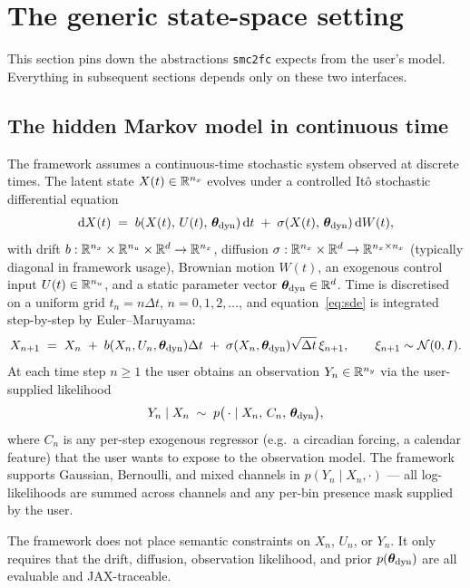 \section{The generic state-space setting} \label{sec:setting}

This section pins down the abstractions \texttt{smc2fc} expects from the
user's model. Everything in subsequent sections depends only on these
two interfaces.

\subsection{The hidden Markov model in continuous time}

The framework assumes a continuous-time stochastic system observed at
discrete times. The latent state $X(t) \in \mathbb{R}^{n_x}$ evolves under a
controlled It\^o stochastic differential equation
\begin{equation}
\mathrm{d} X(t) \;=\; b(X(t),\, U(t),\, \bm{\theta}_{\rm dyn})\, \mathrm{d} t
            \;+\; \sigma(X(t),\, \bm{\theta}_{\rm dyn})\, \mathrm{d} W(t),
\label{eq:sde}
\end{equation}
with drift $b: \mathbb{R}^{n_x} \times \mathbb{R}^{n_u} \times \mathbb{R}^d \to \mathbb{R}^{n_x}$,
diffusion $\sigma: \mathbb{R}^{n_x} \times \mathbb{R}^d \to \mathbb{R}^{n_x \times n_x}$
(typically diagonal in framework usage), Brownian motion $W(t)$, an
exogenous control input $U(t) \in \mathbb{R}^{n_u}$, and a static parameter
vector $\bm{\theta}_{\rm dyn} \in \mathbb{R}^d$. Time is discretised on a uniform grid
$t_n = n \Delta t$, $n = 0, 1, 2, \ldots$, and equation~\eqref{eq:sde}
is integrated step-by-step by Euler--Maruyama:
\begin{equation}
X_{n+1} \;=\; X_n \;+\; b(X_n, U_n, \bm{\theta}_{\rm dyn}) \Delta t
              \;+\; \sigma(X_n, \bm{\theta}_{\rm dyn}) \sqrt{\Delta t}\, \xi_{n+1},
              \qquad \xi_{n+1} \sim \mathcal{N}(0, I).
\label{eq:em}
\end{equation}
At each time step $n \ge 1$ the user obtains an observation
$Y_n \in \mathbb{R}^{n_y}$ via the user-supplied likelihood
\begin{equation}
Y_n \mid X_n \;\sim\; p\bigl(\,\cdot \mid X_n,\, C_n,\, \bm{\theta}_{\rm dyn}\bigr),
\label{eq:obs}
\end{equation}
where $C_n$ is any per-step exogenous regressor (e.g.\ a circadian
forcing, a calendar feature) that the user wants to expose to the
observation model. The framework supports Gaussian, Bernoulli, and
mixed channels in $p(Y_n \mid X_n, \cdot)$ — all log-likelihoods are
summed across channels and any per-bin presence mask supplied by the
user.

The framework does not place semantic constraints on $X_n$, $U_n$, or
$Y_n$. It only requires that the drift, diffusion, observation
likelihood, and prior $p(\bm{\theta}_{\rm dyn})$ are all evaluable and
JAX-traceable.

